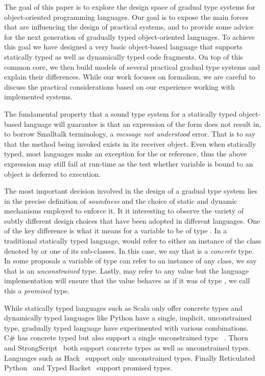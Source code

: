 \documentclass[preprint]{sigplanconf}
\newcommand{\xt}[1]{\sf{#1}}
\begin{document}
The goal of this paper is to explore the design space of gradual  type systems
for object-oriented programming languages. Our goal is to expose the main forces
that are influencing the design of practical systems, and to provide some advice
for the next generation of gradually typed object-oriented languages. To achieve
this goal we have designed a very basic object-based language that supports
statically typed as well as dynamically typed  code fragments. On top of this
common core, we then build models of several practical gradual type systems and
explain their differences. While our work focuses on formalism, we are careful
to discuss the practical considerations based on our experience working with
implemented systems.

The fundamental property that a sound type system for a statically typed object-based 
language will guarantee is that an expression of the form  \xt{x.m(y)} does not
result in, to borrow Smalltalk terminology, a \emph{message not understood} error.
That is to say that the method being invoked exists in its receiver object.
Even when statically typed, most languages make an exception for the \xt{null} or 
\xt{undefined} reference, thus the above expression may still fail at run-time as the 
test whether variable \xt{x} is bound to an  object is deferred to execution.

The most important decision involved in the design of a gradual type system lies 
in the precise definition of \emph{soundness} and the choice of static and dynamic
mechanisms employed to enforce it. It it interesting to observe the variety of
subtly different design choices that have been adopted in different languages. 
One of the key difference is what it means for a variable \xt{x} to be of type
\xt{T}. In a traditional statically typed language, \xt{x} would refer to
either an instance of the class denoted by \xt{T} or one of its sub-classes.
In this case, we say that \xt{T} is a \emph{concrete} type. In some proposals a
variable \xt{x} of type \xt{T} can refer to an instance of any class, we say
that \xt{T} is an \emph{unconstrained} type. Lastly, \xt{x} may refer to any
value but the language implementation will ensure that the value behaves
as if it was of type \xt{T}, we call this a \emph{promised} type.

While statically typed languages such as Scala only offer concrete types
and dynamically typed languages like Python have a single, implicit,
unconstrained type, gradually typed language have experimented  with 
various combinations.  C\# has concrete typed but also support a single
unconstrained type \xt{dyn}~\cite{}. Thorn~\cite{} and StrongScript~\cite{}
both support concrete types as well as unconstrained types. Languages
such as Hack~\cite{} support only unconstrained types.  Finally Reticulated 
Python~\cite{} and Typed Racket~\cite{} support promised types.
\end{document}
